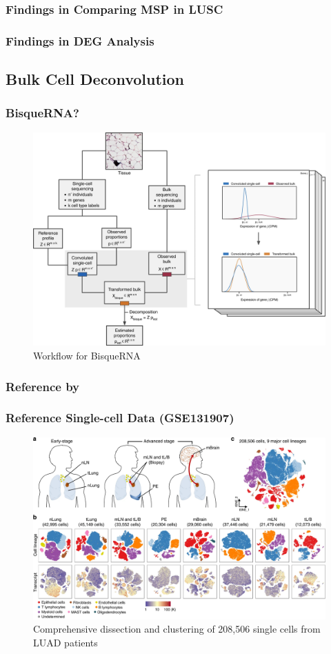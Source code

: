 \documentclass{beamer}
\begin{document}
    \begin{frame}[allowframebreaks]
        \frametitle{Findings in Comparing MSP in LUSC}
    \end{frame}

    \begin{frame}
        \frametitle{Findings in DEG Analysis}
    \end{frame}

        \subsection{Bulk Cell Deconvolution}
    \begin{frame}
        \frametitle{BisqueRNA?}

        \begin{figure}
            \includegraphics[width=0.6 \linewidth]{figures/Workflow/Bisque.jpg}
            \caption{Workflow for BisqueRNA \protect\cite{Bisque1}}
        \end{figure}
    \end{frame}

    \subsubsection{Reference by \protect{}}
    \begin{frame}
         \frametitle{Reference Single-cell Data (GSE131907)}

        \begin{figure}
            \includegraphics[width=0.8 \linewidth]{figures/LungCancer/reference_1.jpg}
            \caption{Comprehensive dissection and clustering of 208,506 single cells from LUAD patients \protect\cite{singlecell1}}
        \end{figure}
    \end{frame}
\end{document}

